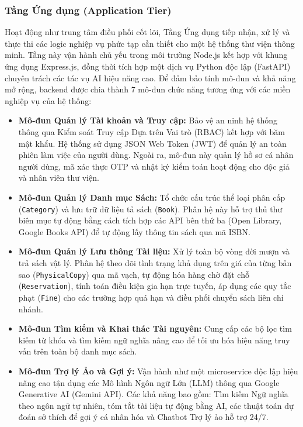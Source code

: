 \subsubsection{Tầng Ứng dụng (Application Tier)}
Hoạt động như trung tâm điều phối cốt lõi, Tầng Ứng dụng tiếp nhận, xử lý và thực thi các logic nghiệp vụ phức tạp cần thiết cho một hệ thống thư viện thông minh. Tầng này vận hành chủ yếu trong môi trường Node.js kết hợp với khung ứng dụng Express.js, đồng thời tích hợp một dịch vụ Python độc lập (FastAPI) chuyên trách các tác vụ AI hiệu năng cao. Để đảm bảo tính mô-đun và khả năng mở rộng, backend được chia thành 7 mô-đun chức năng tương ứng với các miền nghiệp vụ của hệ thống:

\begin{itemize}
	\item \textbf{Mô-đun Quản lý Tài khoản và Truy cập:} Bảo vệ an ninh hệ thống thông qua Kiểm soát Truy cập Dựa trên Vai trò (RBAC) kết hợp với băm mật khẩu. Hệ thống sử dụng JSON Web Token (JWT) để quản lý an toàn phiên làm việc của người dùng. Ngoài ra, mô-đun này quản lý hồ sơ cá nhân người dùng, mã xác thực OTP và nhật ký kiểm toán hoạt động cho độc giả và nhân viên thư viện.

	\item \textbf{Mô-đun Quản lý Danh mục Sách:} Tổ chức cấu trúc thể loại phân cấp (\texttt{Category}) và lưu trữ dữ liệu tả sách (\texttt{Book}). Phân hệ này hỗ trợ thủ thư biên mục tự động bằng cách tích hợp các API bên thứ ba (Open Library, Google Books API) để tự động lấy thông tin sách qua mã ISBN.

	\item \textbf{Mô-đun Quản lý Lưu thông Tài liệu:} Xử lý toàn bộ vòng đời mượn và trả sách vật lý. Phân hệ theo dõi tình trạng khả dụng trên giá của từng bản sao (\texttt{PhysicalCopy}) qua mã vạch, tự động hóa hàng chờ đặt chỗ (\texttt{Reservation}), tính toán điều kiện gia hạn trực tuyến, áp dụng các quy tắc phạt (\texttt{Fine}) cho các trường hợp quá hạn và điều phối chuyển sách liên chi nhánh.

	\item \textbf{Mô-đun Tìm kiếm và Khai thác Tài nguyên:} Cung cấp các bộ lọc tìm kiếm từ khóa và tìm kiếm ngữ nghĩa nâng cao để tối ưu hóa hiệu năng truy vấn trên toàn bộ danh mục sách.

	\item \textbf{Mô-đun Trợ lý Ảo và Gợi ý:} Vận hành như một microservice độc lập hiệu năng cao tận dụng các Mô hình Ngôn ngữ Lớn (LLM) thông qua Google Generative AI (Gemini API). Các khả năng bao gồm: Tìm kiếm Ngữ nghĩa theo ngôn ngữ tự nhiên, tóm tắt tài liệu tự động bằng AI, các thuật toán dự đoán sở thích để gợi ý cá nhân hóa và Chatbot Trợ lý ảo hỗ trợ 24/7.


\end{itemize}
